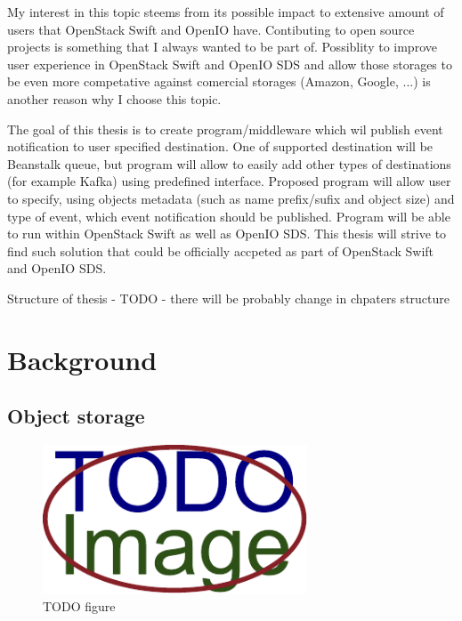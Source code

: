 My interest in this topic steems from its possible impact to extensive amount of users that OpenStack Swift and OpenIO have. Contibuting to open source projects is something that I always wanted to be part of. Possiblity to improve user experience in OpenStack Swift and OpenIO SDS and allow those storages to be even more competative against comercial storages (Amazon, Google, ...) is another reason why I choose this topic.

The goal of this thesis is to create program/middleware which wil publish event notification to user specified destination. One of supported destination will be Beanstalk queue, but program will allow to easily add other types of destinations (for example Kafka) using predefined interface. Proposed program will allow user to specify, using objects metadata (such as name prefix/sufix and object size) and type of event, which event notification should be published. Program will be able to run within OpenStack Swift as well as OpenIO SDS. This thesis will strive to find such solution that could be officially accpeted as part of OpenStack Swift and OpenIO SDS.

Structure of thesis - TODO - there will be probably change in chpaters structure

\chapter{Background}

\section{Object storage}
    \textcolor{gray}{\Blindtext}
    \begin{figure}[hbt]
        \centering
        \includegraphics[width=0.7\textwidth]{obrazky-figures/placeholder.pdf}
        \caption{TODO figure}
    \end{figure}
